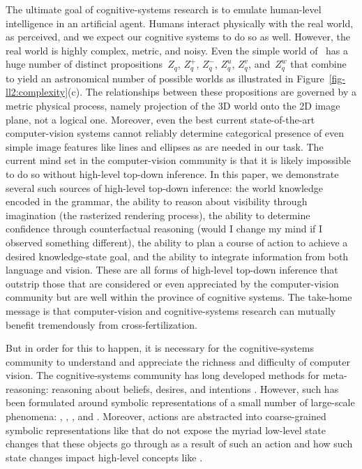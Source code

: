 The ultimate goal of cognitive-systems research is to emulate human-level
intelligence in an artificial agent.
%
Humans interact physically with the real world, as perceived, and we expect our
cognitive systems to do so as well.
%
However, the real world is highly complex, metric, and noisy.
%
Even the simple world of \LincolnLogs\ has a huge number of distinct
propositions~$Z_q$, $Z^+_q$, $Z^-_q$, $Z^u_q$, $Z^v_q$, and~$Z^w_q$ that
combine to yield an astronomical number of possible worlds as illustrated in
Figure~\ref{fig-ll2:complexity}(c).
%
The relationships between these propositions are governed by a metric physical
process, namely projection of the 3D world onto the 2D image plane, not a
logical one.
%
Moreover, even the best current state-of-the-art computer-vision systems cannot
reliably determine categorical presence of even simple image features like
lines and ellipses as are needed in our task.
%
The current mind set in the computer-vision community is that it is likely
impossible to do so without high-level top-down inference.
%
In this paper, we demonstrate several such sources of high-level top-down
inference: the world knowledge encoded in the grammar, the ability to reason
about visibility through imagination (the rasterized rendering process), the
ability to determine confidence through counterfactual reasoning (would I
change my mind if I observed something different), the ability to plan a course
of action to achieve a desired knowledge-state goal, and the ability to
integrate information from both language and vision.
%
These are all forms of high-level top-down inference that outstrip those that are
considered or even appreciated by the computer-vision community but are well
within the province of cognitive systems.
%
The take-home message is that computer-vision and cognitive-systems research
can mutually benefit tremendously from cross-fertilization.

But in order for this to happen, it is necessary for the cognitive-systems
community to understand and appreciate the richness and difficulty of computer
vision.
%
The cognitive-systems community has long developed methods for meta-reasoning:
reasoning about beliefs, desires, and intentions
\cite{Moore1982,Bratman1988,bratman1990,Cohen1990,Rao1991,hobbs1993}.
%
However, such has been formulated around symbolic representations of a small
number of large-scale phenomena:\!
, ,
, and 
.
%
Moreover, actions are abstracted into coarse-grained symbolic representations
like  that do not expose the myriad low-level state
changes that these objects go through as a result of such an action and how
such state changes impact high-level concepts like
.

